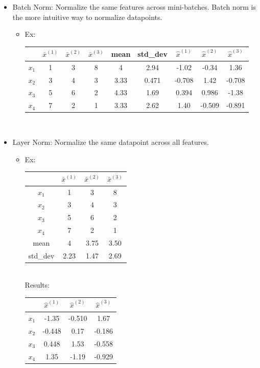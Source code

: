 \documentclass[12pt]{article}
\begin{document}
\begin{itemize}
	\item Batch Norm: Normalize the same features across mini-batches. Batch norm is the more intuitive way to normalize datapoints.
		\begin{itemize}
			\item Ex: 
				\begin{tabular}{|c|c|c|c|c|c|c|c|c|}
					\hline
					& $\bar x^{(1)}$ & $\bar x^{(2)}$ & $\bar x^{(3)}$ & mean & std\_dev & $\hat x^{(1)}$ & $\hat x^{(2)}$ & $\hat x^{(3)}$ \\
					\hline
					$x_1$ & 1 & 3 & 8 & 4 & 2.94 & -1.02 & -0.34 & 1.36\\
					\hline
					$x_2$ & 3 & 4 & 3 & 3.33 & 0.471 & -0.708 & 1.42 & -0.708\\
					\hline
					$x_3$ & 5 & 6 & 2 & 4.33 & 1.69 & 0.394 & 0.986 & -1.38\\
					\hline
					$x_4$ & 7 & 2 & 1 & 3.33 & 2.62 & 1.40 & -0.509 & -0.891\\
					\hline
				\end{tabular}~\\
		\end{itemize}

	\item Layer Norm: Normalize the same datapoint across all features.
		\begin{itemize}
			\item Ex: 
				\begin{tabular}{|c|c|c|c|}
					\hline
					& $\bar x^{(1)}$ & $\bar x^{(2)}$ & $\bar x^{(3)}$\\
					\hline
					$x_1$ & 1 & 3 & 8\\
					\hline
					$x_2$ & 3 & 4 & 3\\
					\hline
					$x_3$ & 5 & 6 & 2\\
					\hline
					$x_4$ & 7 & 2 & 1\\
					\hline
					mean & 4 & 3.75 & 3.50\\
					\hline
					std\_dev & 2.23 & 1.47 & 2.69\\
					\hline
				\end{tabular}~\\

				Results:

				\begin{tabular}{|c|c|c|c|}
					\hline
					& $\hat x^{(1)}$ & $\hat x^{(2)}$ & $\hat x^{(3)}$\\
					\hline
					$x_1$ & -1.35 & -0.510 & 1.67\\
					\hline
					$x_2$ & -0.448 & 0.17 & -0.186\\
					\hline
					$x_3$ & 0.448 & 1.53 & -0.558\\
					\hline
					$x_4$ & 1.35 & -1.19 & -0.929\\
					\hline
				\end{tabular}~\\
		\end{itemize}
\end{itemize}
\end{document}
